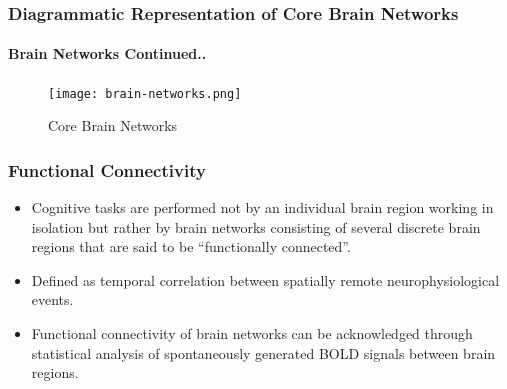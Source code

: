 \documentclass{beamer}
\begin{document}
  \begin{frame}[t]
    \frametitle{Diagrammatic Representation of Core Brain Networks}
    \framesubtitle{Brain Networks Continued..}

    \begin{figure}[H]
      \centering
      \texttt{[image: brain-networks.png]}
      \caption{Core Brain Networks}
    \end{figure}

  \end{frame}


  \begin{frame}[t]
    \frametitle{Functional Connectivity}

    \vskip 25pt

    \begin{itemize}
      \item Cognitive tasks are performed not by an individual brain
        region working in isolation but rather by brain networks
        consisting of several discrete brain regions that are said to
        be ``functionally connected''. \vskip 10pt

      \item Defined as temporal correlation between spatially remote
        neurophysiological events. \vskip 10pt

      \item Functional connectivity of brain networks can be
        acknowledged through statistical analysis of spontaneously
        generated BOLD signals between brain regions.

    \end{itemize}

  \end{frame}
\end{document}
